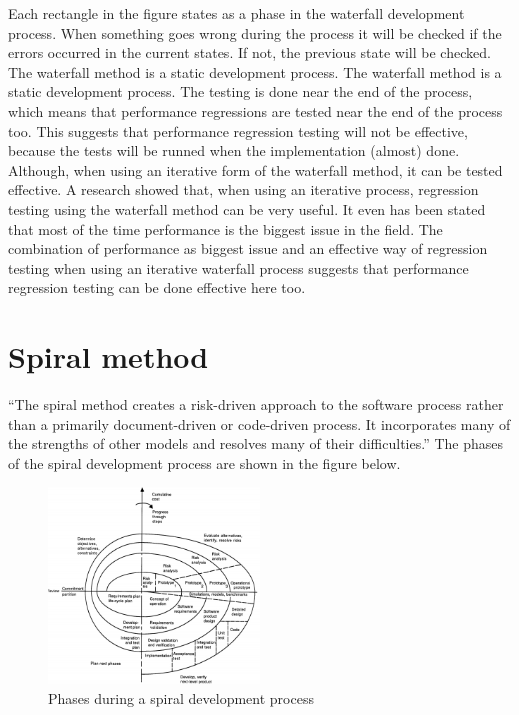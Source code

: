 Each rectangle in the figure states as a phase in the waterfall development process. When something goes wrong during the process it will be checked if the errors occurred in the current states. If not, the previous state will be checked. The waterfall method is a static development process. The waterfall method is a static development process. The testing is done near the end of the process, which means that performance regressions are tested near the end of the process too. This suggests that performance regression testing will not be effective, because the tests will be runned when the implementation (almost) done. Although, when using an iterative form of the waterfall method, it can be tested effective. A research showed that, when using an iterative process, regression testing using the waterfall method can be very useful. It even has been stated that most of the time performance is the biggest issue in the field. \cite{foo2010mining} The combination of performance as biggest issue and an effective way of regression testing when using an iterative waterfall process suggests that performance regression testing can be done effective here too.

\section{Spiral method}
``The spiral method creates a risk-driven approach to the software process rather than a primarily document-driven or code-driven process. It incorporates many of the strengths
of other models and resolves many of their
difficulties.''\cite{boehm1988spiral} The phases of the spiral development process are shown in the figure below. 

\begin{figure}[H]
\begin{center}
  \includegraphics[width=0.5\textwidth]{Figures/spiral.jpg}
\end{center}
  \caption{Phases during a spiral development process\cite{boehm1988spiral}} 
\end{figure}


